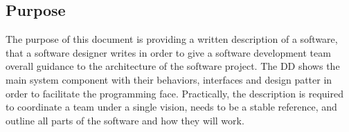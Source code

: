 \subsection{Purpose}
The purpose of this document is providing a written description of a software, that a software designer writes in order to give a software development team overall guidance to the architecture of the software project. The DD shows the main system component with their behaviors, interfaces and design patter in order to facilitate the programming face. Practically, the description is required to coordinate a team under a single vision, needs to be a stable reference, and outline all parts of the software and how they will work.